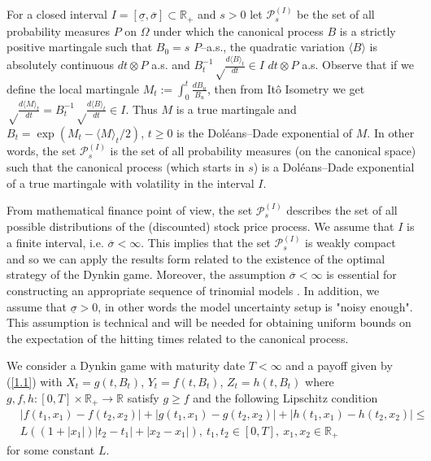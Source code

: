 \documentclass{amsart}
\numberwithin{equation}{section}
\begin{document}
For a closed interval $I=[\underline{\sigma},\overline{\sigma}]\subset {\mathbb R}_{+}$ and $s>0$ let
$\mathcal P^{(I)}_s$ be the set of all probability measures $P$ on $\Omega$ under which the canonical
process $B$ is a strictly positive martingale
such that $B_0=s$ $P$--a.s.,
the quadratic variation $\langle  B\rangle $ is absolutely continuous $dt\otimes P$ a.s.  and
$B^{-1}_t\sqrt\frac{d\langle  B\rangle _t}{dt}\in I$ $dt\otimes P$ a.s. Observe that if we define the local martingale
$M_t:=\int_{0}^t \frac{d B_u}{B_u}$, then from It\^{o} Isometry we get
$\sqrt\frac{d\langle M\rangle_t}{dt}=B^{-1}_t\sqrt\frac{d\langle  B\rangle _t}{dt}\in I$. Thus $M$ is a true martingale
and $B_t=\exp(M_t-\langle M\rangle _t/2)$, $t\geq 0$ is the
Dol\'{e}ans--Dade exponential
of $M$. In other words, the set
$\mathcal P^{(I)}_s$ is the set of all probability measures (on the canonical space) such that the canonical process
(which starts in $s$) is a Dol\'{e}ans--Dade exponential of a true martingale with volatility in the interval $I$.

From mathematical finance point of view, the set $\mathcal P^{(I)}_s$
describes the set of all possible distributions of the (discounted) stock price process.
We assume that $I$ is a finite interval, i.e.
$\overline{\sigma}<\infty$. This implies that the set $\mathcal P^{(I)}_s$ is weakly compact and so we can apply the results form \cite{BY}
related to the existence of the optimal strategy of the Dynkin game.
Moreover, the assumption $\overline{\sigma}<\infty$ is essential for
constructing an appropriate sequence of trinomial models .
In addition, we assume that
$\underline{\sigma}>0$, in other words
the model uncertainty setup is "noisy enough". This assumption is technical and will be needed for
obtaining uniform bounds on the expectation of the hitting times
related to the canonical process.

We consider a Dynkin game with maturity date $T<\infty$ and
a payoff given by (\ref{1.1}) with
$X_t=g(t,B_t)$, $Y_t=f(t,B_t)$,
$Z_t=h(t,B_t)$
where $g,f,h:[0,T]\times\mathbb R_{+}\rightarrow \mathbb R$ satisfy
$g\geq f$ and the following Lipschitz condition
\begin{eqnarray}\label{2.function}
&|f(t_1,x_1)-f(t_2,x_2)|+|g(t_1,x_1)-g(t_2,x_2)|+|h(t_1,x_1)-h(t_2,x_2)|\leq \\
&L \left((1+|x_1|)|t_2-t_1|+|x_2-x_1|\right), \ t_1,t_2\in [0,T], \ x_1,x_2\in \mathbb R_{+} \nonumber
\end{eqnarray}
for some constant $L$.
\end{document}
